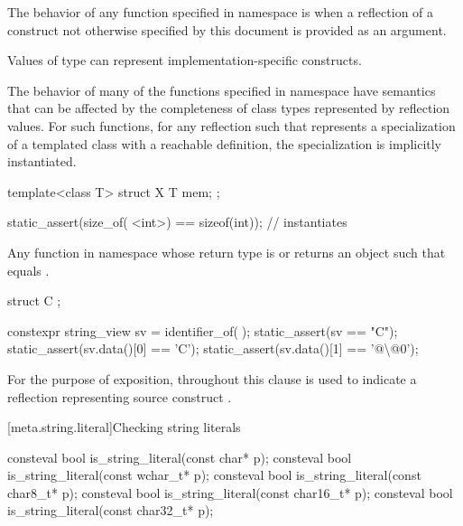 \pnum
The behavior of any function specified in namespace  is
when a reflection of a construct not otherwise specified by this document
is provided as an argument.
\begin{note}
Values of type 
can represent implementation-specific constructs.
\end{note}
\begin{note}
The behavior of many of the functions specified in namespace 
have semantics that can be affected by
the completeness of class types represented by reflection values.
For such functions,
for any reflection  such that 
represents a specialization of a templated class with a reachable definition,
the specialization is implicitly instantiated.
\begin{example}
\begin{codeblock}
template<class T>
struct X {
  T mem;
};

static_assert(size_of(^^X<int>) == sizeof(int));    // instantiates 
\end{codeblock}
\end{example}
\end{note}

\pnum
Any function in namespace 
whose return type is  or 
returns an object  such that
 equals .
\begin{example}
\begin{codeblock}
struct C { };

constexpr string_view sv = identifier_of(^^C);
static_assert(sv == "C");
static_assert(sv.data()[0] == 'C');
static_assert(sv.data()[1] == '@\textbackslash{}@0');
\end{codeblock}
\end{example}

\pnum
For the purpose of exposition,
throughout this clause  is used
to indicate a reflection representing source construct .

[meta.string.literal]{Checking string literals}

%
\begin{itemdecl}
consteval bool is_string_literal(const char* p);
consteval bool is_string_literal(const wchar_t* p);
consteval bool is_string_literal(const char8_t* p);
consteval bool is_string_literal(const char16_t* p);
consteval bool is_string_literal(const char32_t* p);
\end{itemdecl}

